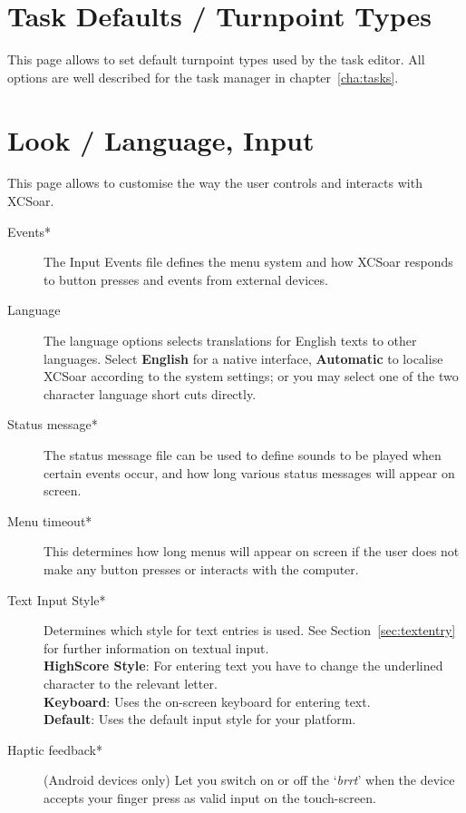 \section{Task Defaults / Turnpoint Types}

This page allows to set default turnpoint types used by the task editor. All 
options are well described for the task manager in chapter~\ref{cha:tasks}.


\section{Look / Language, Input}\label{sec:interface}

This page allows to customise the way the user controls and interacts with
XCSoar.

\begin{description}
\item[Events*]  The Input Events file defines the menu system and how XCSoar
  responds to button presses and events from external devices.
\item[Language]  The language options selects translations for English texts to
  other languages.  Select {\bf English} for a native interface, {\bf Automatic}
  to localise XCSoar according to the system settings; or you may select one of 
  the two character language short cuts directly.
\item[Status message*]  The status message file can be used to define sounds to 
  be played when certain events occur, and how long various status messages will 
  appear on screen.
\item[Menu timeout*]  This determines how long menus will appear on screen if the user
  does not make any button presses or interacts with the computer.
\item[Text Input Style*]  Determines which style for text entries is used. 
  See Section~\ref{sec:textentry} for further information on textual input. \\
  {\bf HighScore Style}: For entering text you have to change the underlined 
  character to the relevant letter. \\
  {\bf Keyboard}: Uses the on-screen keyboard for entering text. \\
  {\bf Default}: Uses the default input style for your platform.
\item[Haptic feedback*]  (Android devices only) Let you switch on or off the `{\it brrt}' 
  when the device accepts your finger press as valid input on the touch-screen.
\end{description}

